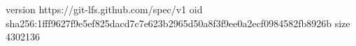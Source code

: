 version https://git-lfs.github.com/spec/v1
oid sha256:1fff9627f9e5ef825dacd7c7e623b2965d50a8f3f9ee0a2ecf0984582fb8926b
size 4302136
